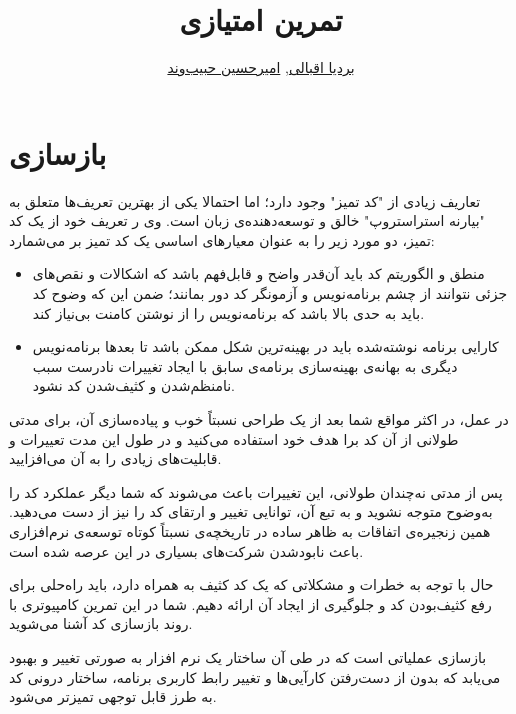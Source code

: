 \documentclass{utap}
\title{تمرین  امتیازی}
\author{
    \href{mailto:bardia.eghbali@gmail.com?subject=[AP\%20S98\%20Refactoring]\%20}{بردیا اقبالی},
    \href{mailto:ahhabibvand@gmail.com?subject=[AP\%20S98\%20Refactoring]\%20}{امیرحسین حبیب‌وند}
}
\begin{document}
\lstset{
    numbers=left,
    frame=leftline,
}

\maketitle

\section{بازسازی}
تعاریف زیادی از
"ﮐﺪ ﺗﻤﯿﺰ"
وجود دارد؛ اما احتمالا یکی از بهترین تعریف‌ها متعلق به
"ﺑﯿﺎرﻧﻪ اﺳﺘﺮاﺳﺘﺮوپ" 
خالق و توسعه‌دهنده‌ی زبان  است. وی ر تعریف خود از یک کد تمیز، دو مورد زیر را به عنوان معیار‌های اساسی یک کد تمیز بر می‌شمارد:

    \begin{itemize}
        \item
منطق و الگوریتم کد باید آن‌قدر واضح و قابل‌فهم باشد که اشکالات و نقص‌های ﺟﺰﺋﯽ نتوانند از چشم برنامه‌نویس و آزمونگر کد دور بمانند؛ ضمن این که وضوح کد باید به حدی بالا باشد که برنامه‌نویس را از نوشتن کامنت بی‌نیاز کند.

        \item
کارایی
برنامه نوشته‌شده باید در بهینه‌ترین
شکل ممکن باشد تا بعدها برنامه‌نویس دیگری به بهانه‌ی بهینه‌سازی
برنامه‌ی سابق با ایجاد تغییرات نادرست سبب نامنظم‌شدن و کثیف‌شدن کد نشود.
    \end{itemize}

در عمل، در اکثر مواقع شما بعد از یک طراحی نسبتاً خوب و پیاده‌سازی آن، برای مدتی طولانی از آن کد برا هدف خود استفاده می‌کنید و در طول این مدت تعییرات و قابلیت‌های زیادی را به آن می‌افزایید.

پس از مدتی نه‌چندان طولانی، این تغییرات باعث می‌شوند که شما دیگر عملکرد کد را به‌وضوح متوجه نشوید و به تبع آن، توانایی تغییر و ارتقای کد را نیز از دست می‌دهید. همین زنجیره‌ی اتفاقات به ظاهر ساده در تاریخچه‌ی نسبتاً کوتاه توسعه‌ی نرم‌افزاری باعث نابود‌شدن شرکت‌های بسیاری در این عرصه شده است.

حال با توجه به خطرات و مشکلاتی که یک کد کثیف به همراه دارد، باید راه‌حلی برای رفع کثیف‌بودن کد و جلو‌‌گیری از ایجاد آن اراﺋﻪ دهیم. شما در این تمرین کامپیوتری با روند بازسازی کد آشنا می‌شوید.

بازسازی عملیاتی است که در طی آن ساختار یک نرم افزار به صورتی تغییر و بهبود می‌یابد که بدون از دست‌رفتن کارآیی‌ها و تغییر رابط کاربری برنامه، ساختار درونی کد به طرز قابل توجهی تمیزتر می‌شود.
\end{document}
